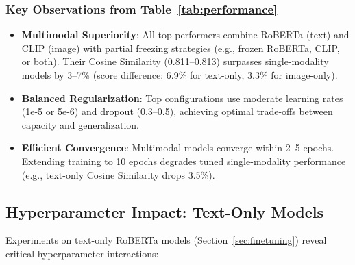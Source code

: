 \subsubsection*{Key Observations from Table~\ref{tab:performance}}

\begin{itemize}
    \item \textbf{Multimodal Superiority}: All top performers combine RoBERTa (text) and CLIP (image) with partial freezing strategies (e.g., frozen RoBERTa, CLIP, or both). Their Cosine Similarity (0.811--0.813) surpasses single-modality models by 3--7\% (score difference: 6.9\% for text-only, 3.3\% for image-only).
    \item \textbf{Balanced Regularization}: Top configurations use moderate learning rates (1e-5 or 5e-6) and dropout (0.3--0.5), achieving optimal trade-offs between capacity and generalization.
    \item \textbf{Efficient Convergence}: Multimodal models converge within 2--5 epochs. Extending training to 10 epochs degrades tuned single-modality performance (e.g., text-only Cosine Similarity drops 3.5\%).
\end{itemize}

\subsection{Hyperparameter Impact: Text-Only Models}
\label{subsec:text-hparams}

Experiments on text-only RoBERTa models (Section~\ref{sec:finetuning}) reveal critical hyperparameter interactions:

